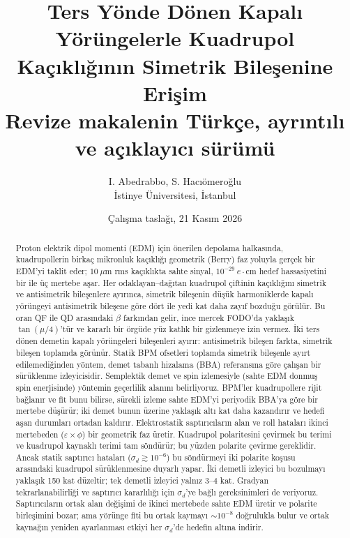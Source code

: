 \documentclass[11pt,a4paper]{article}
\title{Ters Yönde Dönen Kapalı Yörüngelerle Kuadrupol Kaçıklığının Simetrik Bileşenine Erişim\\[4pt]
\large Revize makalenin Türkçe, ayrıntılı ve açıklayıcı sürümü}
\author{I. Abedrabbo, S. Hacıömeroğlu\\ \small İstinye Üniversitesi, İstanbul}
\date{Çalışma taslağı, 21 Kasım 2026}
\begin{document}
\sloppy
\maketitle

\begin{abstract}
\noindent Proton elektrik dipol momenti (EDM) için önerilen depolama halkasında, kuadrupollerin birkaç
mikronluk kaçıklığı geometrik (Berry) faz yoluyla gerçek bir EDM'yi taklit eder; $10~\mu$m rms kaçıklıkta
sahte sinyal, $10^{-29}~e\cdot$cm hedef hassasiyetini bir ile üç mertebe aşar. Her odaklayan--dağıtan
kuadrupol çiftinin kaçıklığını simetrik ve antisimetrik bileşenlere ayırınca, simetrik bileşenin düşük
harmoniklerde kapalı yörüngeyi antisimetrik bileşene göre dört ile yedi kat daha zayıf bozduğu görülür. Bu
oran QF ile QD arasındaki $\beta$ farkından gelir, ince mercek FODO'da yaklaşık $\tan(\mu/4)$'tür ve kararlı
bir örgüde yüz katlık bir gizlenmeye izin vermez. İki ters dönen demetin kapalı yörüngeleri bileşenleri
ayırır: antisimetrik bileşen farkta, simetrik bileşen toplamda görünür. Statik BPM ofsetleri toplamda simetrik
bileşenle ayırt edilemediğinden yöntem, demet tabanlı hizalama (BBA) referansına göre çalışan bir sürüklenme
izleyicisidir. Semplektik demet ve spin izlemesiyle (sahte EDM donmuş spin enerjisinde) yöntemin geçerlilik
alanını belirliyoruz. BPM'ler kuadrupollere rijit bağlanır ve fit bunu bilirse, sürekli izleme sahte EDM'yi
periyodik BBA'ya göre bir mertebe düşürür; iki demet bunun üzerine yaklaşık altı kat daha kazandırır ve
hedefi aşan durumları ortadan kaldırır. Elektrostatik saptırıcıların alan ve roll hataları ikinci mertebeden
($\varepsilon\times\phi$) bir geometrik faz üretir. Kuadrupol polaritesini çevirmek bu terimi ve kuadrupol
kaynaklı terimi tam söndürür; bu yüzden polarite çevirme gereklidir. Ancak statik saptırıcı hataları
($\sigma_d\gtrsim10^{-6}$) bu söndürmeyi iki polarite koşusu arasındaki kuadrupol sürüklenmesine duyarlı
yapar. İki demetli izleyici bu bozulmayı yaklaşık 150 kat düzeltir; tek demetli izleyici yalnız 3--4 kat.
Gradyan tekrarlanabilirliği ve saptırıcı kararlılığı için $\sigma_d$'ye bağlı gereksinimleri de veriyoruz.
Saptırıcıların ortak alan değişimi de ikinci mertebede sahte EDM üretir ve polarite birleşimini bozar; ama
yörünge fiti bu ortak kaymayı $\sim10^{-8}$ doğrulukla bulur ve ortak kaynağın yeniden ayarlanması etkiyi her
$\sigma_d$'de hedefin altına indirir.
\end{abstract}

\tableofcontents
\newpage
\end{document}
